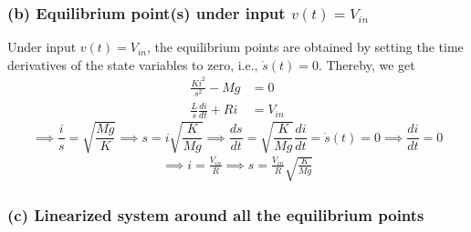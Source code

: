 \subsubsection*{(b) Equilibrium point(s) under input \(v(t)=V_{in}\)}

Under input \( v(t)=V_{in} \), the equilibrium points are obtained by setting the time derivatives of the state variables to zero, i.e., \( \dot s(t) = 0 \).
Thereby, we get
\begin{align*}
    \frac{Ki^2}{s^2} - Mg         & = 0      \\
    \frac{L}{s}\frac{di}{dt} + Ri & = V_{in}
\end{align*}
\begin{equation*}
    \implies
    \frac{i}{s} = \sqrt{\frac{Mg}{K}}
    \implies
    s = i \sqrt{\frac{K}{Mg}}
    \implies
    \frac{ds}{dt} = \sqrt{\frac{K}{Mg}} \frac{di}{dt} = \dot s(t) = 0
    \implies
    \frac{di}{dt} = 0
\end{equation*}
\begin{align*}
    \implies
    i = \frac{V_{in}}{R}
    \implies
    \boxed{
        s = \frac{V_{in}}{R} \sqrt{\frac{K}{Mg}}
    }
\end{align*}

\subsubsection*{(c) Linearized system around all the equilibrium points}

